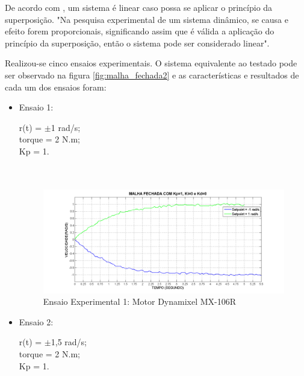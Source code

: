 \documentclass[12pt,oneside,a4paper, chapter=TITLE, section = TITLE, english, brazil]{abntex2}
\begin{document}
De acordo com , um sistema é linear caso possa se aplicar o princípio da superposição. "Na pesquisa experimental de um sistema dinâmico, se causa e efeito forem proporcionais, significando assim que é válida a aplicação do princípio da superposição, então o sistema pode ser considerado linear".

Realizou-se cinco ensaios experimentais. O sistema equivalente ao testado pode ser observado na figura \ref{fig:malha_fechada2} e as características e resultados de cada um dos ensaios foram:\\

\begin{itemize}

\item Ensaio 1:
 
r(t) = $\pm$1 rad/s;\\
torque = 2 N.m;\\
Kp = 1.\\
\\
\\

\begin{figure}[h] %
\centering
\includegraphics[scale=0.48]{./imagens/Ensaio1}
\caption[Ensaio Experimental Motor 1: Motor Dynamixel MX-106R]{Ensaio Experimental 1: Motor Dynamixel MX-106R}
\label{fig:ensaio1}
\end{figure}


\item Ensaio 2:
 
r(t) = $\pm$1,5 rad/s;\\
torque = 2 N.m;\\
Kp = 1.\\
\\
\\
\\
\\
\\


\end{itemize}
\end{document}

